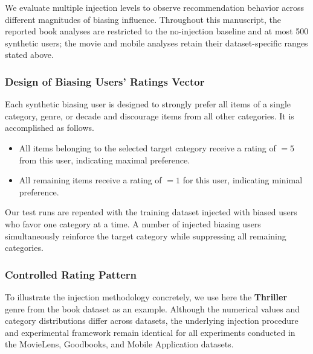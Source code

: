 \documentclass[information,article,submit,pdftex,moreauthors]{Definitions/mdpi}
\newif\ifrevisionnotes
\newcommand{\saracomment}[1]{\ifrevisionnotes\par\smallskip\noindent\textcolor{orange}{\textbf{Sara:} #1}\par\smallskip\fi}
\begin{document}
We evaluate multiple injection levels to observe recommendation behavior across different magnitudes of biasing influence. Throughout this manuscript, the reported book analyses are restricted to the no-injection baseline and at most 500 synthetic users; the movie and mobile analyses retain their dataset-specific ranges stated above. 

\saracomment{Audited the manuscript for book injection counts. The reported book range is 2--500 synthetic users (up to approximately 0.94 percent), with the no-injection baseline retained. The profile-collection illustration and the training-figure caption now use the same maximum. Movie and mobile ranges and examples are unchanged.}

\subsubsection{Design of Biasing Users' Ratings Vector}

Each synthetic biasing user is designed to strongly prefer all items of a single category, genre, or decade and discourage items from all other categories. It is accomplished as follows.

\begin{itemize}
\item All items belonging to the selected target category receive a rating of $=5$ from this user, indicating maximal preference.
\item All remaining items receive a rating of $=1$ for this user, indicating minimal preference.
\end{itemize}

Our test runs are repeated with the training dataset injected with biased users who favor one category at a time. 
A number of injected biasing users simultaneously reinforce the target category while suppressing all remaining categories. 

\saracomment{Clarified that the intervention both promotes target items and assigns low ratings elsewhere. Effects on other categories cannot be described as purely indirect spillover. Removed the unverified exact count of 143 generated datasets pending run-log verification.}

\subsubsection{Controlled Rating Pattern}

To illustrate the injection methodology concretely, we use here the \textbf{Thriller} genre from the book dataset as an example. Although the numerical values and category distributions differ across datasets, the underlying injection procedure and experimental framework remain identical for all experiments conducted in the MovieLens, Goodbooks, and Mobile Application datasets.
\end{document}
